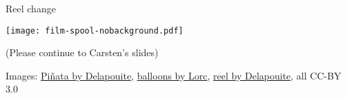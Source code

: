 \documentclass[aspectratio=169]{beamer}
\begin{document}
\begin{frame}{Reel change}
	\begin{block}{\texttt{[image: film-spool-nobackground.pdf]}\mbox{\quad}}
		\mbox{}

		\vspace{-1.7cm}

		(Please continue to Carsten's slides)
	\end{block}

	\vfill
	\tiny Images:
	\href{https://game-icons.net/1x1/delapouite/pinata.html}{Piñata by Delapouite},
	\href{https://game-icons.net/1x1/lorc/balloons.html}{balloons by Lorc},
	\href{https://game-icons.net/1x1/delapouite/film-spool.html}{reel by Delapouite}, all CC-BY 3.0
\end{frame}
\end{document}
